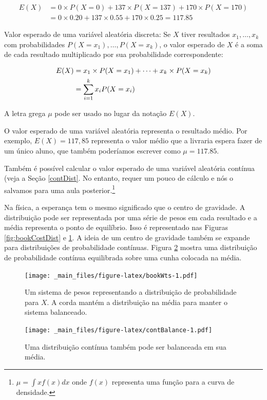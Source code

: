 \documentclass[
]{book}
\theoremstyle{definition}
\theoremstyle{definition}
\theoremstyle{definition}
\theoremstyle{definition}
\theoremstyle{remark}
\begin{document}
\begin{align*}
E(X) &= 0 \times  P(X=0) + 137 \times  P(X=137) + 170 \times  P(X=170) \\
    &= 0 \times  0.20 + 137 \times  0.55 + 170 \times  0.25 = 117.85
\end{align*}

Valor esperado de uma variável aleatória discreta: Se \(X\) tiver resultados \(x_1, \dots, x_k\) com probabilidades \(P(X=x_1),\dots, P(X=x_k)\), o valor esperado de \(X\) é a soma de cada resultado multiplicado por sua probabilidade correspondente:

\begin{align}
E(X)    &= x_1\times P(X=x_1) + \cdots + x_k\times P(X=x_k) \notag \\
    &= \sum_{i=1}^{k}x_iP(X=x_i)
\end{align}

A letra grega \(\mu\) pode ser usado no lugar da notação \(E(X)\).

O valor esperado de uma variável aleatória representa o resultado médio. Por exemplo, \(E(X) = 117,85\) representa o valor médio que a livraria espera fazer de um único aluno, que também poderíamos escrever como \(\mu=117.85\).

Também é possível calcular o valor esperado de uma variável aleatória contínua (veja a Seção \ref{contDist}. No entanto, requer um pouco de cálculo e nós o salvamos para uma aula posterior.\footnote{\(\mu = \int xf(x)dx\) onde \(f(x)\) representa uma função para a curva de densidade.}

Na física, a esperança tem o mesmo significado que o centro de gravidade. A distribuição pode ser representada por uma série de pesos em cada resultado e a média representa o ponto de equilíbrio. Isso é representado nas Figuras \ref{fig:bookCostDist} e \ref{fig:bookWts}. A ideia de um centro de gravidade também se expande para distribuições de probabilidade contínuas. Figura \ref{fig:contBalance} mostra uma distribuição de probabilidade contínua equilibrada sobre uma cunha colocada na média.

\begin{figure}
\centering
\texttt{[image: \_main\_files/figure-latex/bookWts-1.pdf]}
\caption{\label{fig:bookWts}Um sistema de pesos representando a distribuição de probabilidade para \(X\). A corda mantém a distribuição na média para manter o sistema balanceado.}
\end{figure}

\begin{figure}
\centering
\texttt{[image: \_main\_files/figure-latex/contBalance-1.pdf]}
\caption{\label{fig:contBalance}Uma distribuição contínua também pode ser balanceada em sua média.}
\end{figure}
\end{document}
